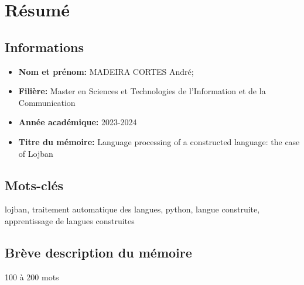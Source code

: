 \section*{Résumé} %
\label{sec:resume}

\subsection*{Informations}

\begin{itemize}
    \setlength\itemsep{0.1em}
    \item \textbf{Nom et prénom:} MADEIRA CORTES André;
    \item \textbf{Filière:} Master en Sciences et Technologies de l'Information et de la Communication
    \item \textbf{Année académique:} 2023-2024
    \item \textbf{Titre du mémoire:} Language processing of a constructed language: the case of Lojban
\end{itemize}

\subsection*{Mots-clés}

lojban, traitement automatique des langues, python, langue construite, apprentissage de langues construites

\subsection*{Brève description du mémoire}

100 à 200 mots